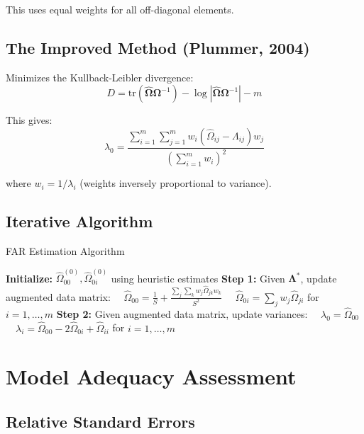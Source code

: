 \documentclass[11pt]{article}
\begin{document}
This uses equal weights for all off-diagonal elements.

\subsection{The Improved Method (Plummer, 2004)}

Minimizes the Kullback-Leibler divergence:
\begin{equation}
    D = \text{tr}(\hat{\boldsymbol{\Omega}}\boldsymbol{\Omega}^{-1}) - \log|\hat{\boldsymbol{\Omega}}\boldsymbol{\Omega}^{-1}| - m
\end{equation}

This gives:
\begin{equation}
    \lambda_0 = \frac{\sum_{i=1}^m \sum_{j=1}^m w_i(\hat{\Omega}_{ij} - \Lambda_{ij})w_j}{(\sum_{i=1}^m w_i)^2}
\end{equation}

where $w_i = 1/\lambda_i$ (weights inversely proportional to variance).

\subsection{Iterative Algorithm}

\begin{algorithm}
\caption{FAR Estimation Algorithm}
\begin{algorithmic}
\STATE \textbf{Initialize:} $\hat{\Omega}_{00}^{(0)}, \hat{\Omega}_{0i}^{(0)}$ using heuristic estimates
\REPEAT
    \STATE \textbf{Step 1:} Given $\boldsymbol{\Lambda}^*$, update augmented data matrix:
    \STATE $\quad \hat{\Omega}_{00} = \frac{1}{S} + \frac{\sum_j \sum_k w_j \hat{\Omega}_{jk} w_k}{S^2}$
    \STATE $\quad \hat{\Omega}_{0i} = \sum_j w_j \hat{\Omega}_{ji}$ for $i = 1, \ldots, m$
    \STATE \textbf{Step 2:} Given augmented data matrix, update variances:
    \STATE $\quad \lambda_0 = \hat{\Omega}_{00}$
    \STATE $\quad \lambda_i = \hat{\Omega}_{00} - 2\hat{\Omega}_{0i} + \hat{\Omega}_{ii}$ for $i = 1, \ldots, m$
\end{algorithmic}
\end{algorithm}

\section{Model Adequacy Assessment}

\subsection{Relative Standard Errors}
\end{document}
